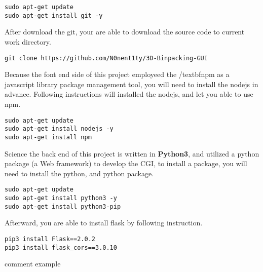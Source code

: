 \documentclass{article}
\begin{document}
\begin{mdframed}[backgroundcolor=bg]
\begin{verbatim}
sudo apt-get update
sudo apt-get install git -y
\end{verbatim}
\end{mdframed}

\noindent After download the git, your are able to download the source code to current work directory.
\begin{mdframed}[backgroundcolor=bg]
\begin{verbatim}
git clone https://github.com/N0nent1ty/3D-Binpacking-GUI
\end{verbatim}
\end{mdframed}

\noindent Because the font end side of this project employeed the /textbf{npm} as a javascript library package management tool, you will need to install the nodejs in advance.
Following instructions will installed the nodejs, and let you able to use npm.

\begin{mdframed}[backgroundcolor=bg]
\begin{verbatim}
sudo apt-get update
sudo apt-get install nodejs -y
sudo apt-get install npm
\end{verbatim}
\end{mdframed}

Science the back end of this project is written in \textbf{Python3}, and utilized a python package (a Web framework) to develop the CGI, to install a package, you will need to install the python, and python package.

\begin{mdframed}[backgroundcolor=bg]
\begin{verbatim}
sudo apt-get update
sudo apt-get install python3 -y
sudo apt-get install python3-pip
\end{verbatim}
\end{mdframed}

\noindent Afterward, you are able to install flask by following instruction.
\begin{mdframed}[backgroundcolor=bg]
\begin{verbatim}
pip3 install Flask==2.0.2
pip3 install flask_cors==3.0.10
\end{verbatim}
\end{mdframed}

comment example
\end{document}
